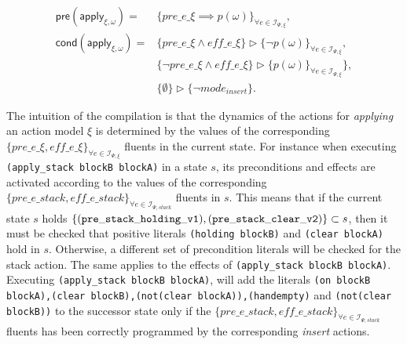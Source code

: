 \documentclass{article}
\newcommand{\pre}{\mathsf{pre}}     %
\newcommand{\cond}{\mathsf{cond}}   %
\begin{document}
\begin{small}
\begin{align*}
\pre(\mathsf{apply_{\xi,\omega}})=&\{pre\_e\_\xi\implies p(\omega)\}_{\forall e\in{\mathcal I}_{\Psi,\xi}},\\
\cond(\mathsf{apply_{\xi,\omega}})=&\{pre\_e\_\xi\wedge eff\_e\_\xi\}\rhd\{\neg p(\omega)\}_{\forall e\in{\mathcal I}_{\Psi,\xi}},\\
&\{\neg pre\_e\_\xi \wedge eff\_e\_\xi\}\rhd\{p(\omega)\}_{\forall e\in{\mathcal I}_{\Psi,\xi}}\},\\
&\{\emptyset\}\rhd\{\neg mode_{insert}\}.
\end{align*}
\end{small}

The intuition of the compilation is that the dynamics of the actions for {\em applying} an action model $\xi$ is determined by the values of the corresponding $\{pre\_e\_\xi, eff\_e\_\xi\}_{\forall e\in{\mathcal I}_{\Psi,\xi}}$ fluents in the current state. For instance when executing {\tt{\small (apply\_stack blockB blockA)}} in a state $s$, its preconditions and effects are activated according to the values of the corresponding $\{pre\_e\_stack, eff\_e\_stack\}_{\forall e\in{\mathcal I}_{\Psi,stack}}$ fluents in $s$. This means that if the current state $s$ holds $\{{\tt\scriptsize (pre\_stack\_holding\_v1),(pre\_stack\_clear\_v2)}\} \subset s$, then it must be checked that positive literals {\tt{\small (holding blockB)}} and {\tt{\small (clear blockA)}} hold in $s$. Otherwise, a different set of precondition literals will be checked for the stack action. The same applies to the effects of {\tt{\small (apply\_stack blockB blockA)}}. Executing {\tt{\small (apply\_stack blockB blockA)}}, will add the literals {\tt{\small (on blockB blockA),(clear blockB),(not(clear blockA)),(handempty)}} and {\tt{\small(not(clear blockB))}} to the successor state only if the $\{pre\_e\_stack, eff\_e\_stack\}_{\forall e\in{\mathcal I}_{\Psi,stack}}$ fluents has been correctly programmed by the corresponding {\em insert} actions.
\end{document}
